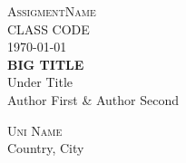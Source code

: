 \thispagestyle{empty}
\begin{center}
	\textsc{\large AssigmentName \\ CLASS CODE \\ \today}\\[4cm]
	\textbf{\Large BIG TITLE} \\[1cm]
	{\large Under Title}\\[1cm]
	{\large Author First \& Author Second}
	
	\vfill	
	\begin{figure}[H]
	\centering
    
	\end{figure}	\vspace{5mm}	
	
	\textsc{Uni Name} \\
	 Country, City \the\year \\
\end{center}
\newpage
